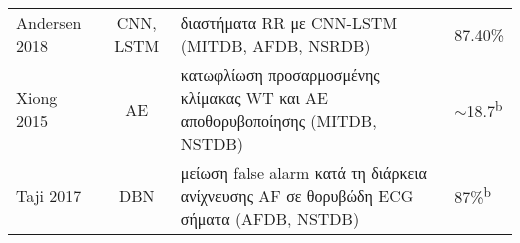 \begin{sidewaystable}
\begin{tabular}{l c l l}
		Andersen 2018~\cite{andersen2018deep}           & CNN, LSTM       & διαστήματα RR με CNN-LSTM (MITDB, AFDB, NSRDB)                                                        & 87.40\%                                                                                                                                                                                                                                                                                                                                                                                                                                                                                                                                                                                                                                                                                                                                                                                                                                                                          \\
		Xiong 2015~\cite{xiong2015denoising}            & AE              & κατωφλίωση προσαρμοσμένης κλίμακας WT και AE αποθορυβοποίησης (MITDB, NSTDB)                          & $\sim$18.7\textsuperscript{b}                                                                                                                                                                                                                                                                                                                                                                                                                                                                                                                                                                                                                                                                                                                                                                                                                                               \\
		Taji 2017~\cite{taji2017false}                  & DBN             & μείωση false alarm κατά τη διάρκεια ανίχνευσης AF σε θορυβώδη ECG σήματα (AFDB, NSTDB)                & 87\%\textsuperscript{b}                                                                                                                                                                                                                                                                                                                                                                                                                                                                                                                                                                                                                                                                                                                                                                                                                                                     \\

\end{tabular}
\end{sidewaystable}
